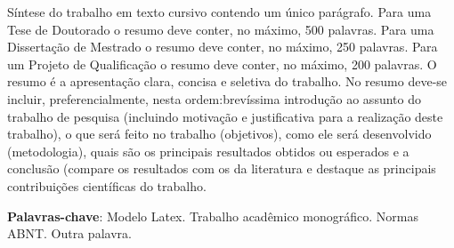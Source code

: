 
\begin{resumo}
    Síntese do trabalho em texto cursivo contendo um único parágrafo.
    Para uma Tese de Doutorado o resumo deve conter, no máximo, 500 palavras.
    Para uma Dissertação de Mestrado o resumo deve conter, no máximo, 250 palavras.
    Para um Projeto de Qualificação o resumo deve conter, no máximo, 200 palavras.
    O resumo é a apresentação clara, concisa e seletiva do trabalho.
    No resumo deve-se incluir, preferencialmente, nesta ordem:brevíssima introdução ao assunto do trabalho de pesquisa (incluindo motivação e justificativa para a realização deste trabalho), o que será feito no trabalho (objetivos), como ele será desenvolvido (metodologia), quais são os principais resultados obtidos ou esperados e a conclusão (compare os resultados com os da literatura e destaque as principais contribuições científicas do trabalho.

    \textbf{Palavras-chave}: Modelo Latex. Trabalho acadêmico monográfico. Normas ABNT. Outra palavra.
\end{resumo}

